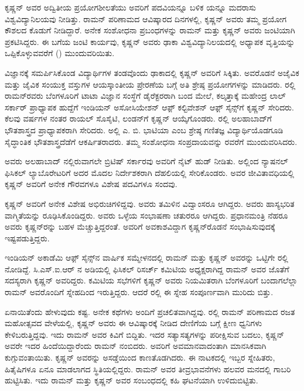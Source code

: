 ಕೃಷ್ಣನ್ ಅವರ ಅದ್ವಿತೀಯ ಪ್ರಯೋಗಶೀಲತೆಯು ಅವರಿಗೆ  ಪದವಿಯನ್ನೂ ಬಳಿಕ  ಯನ್ನೂ ಮದರಾಸು ವಿಶ್ವವಿದ್ಯಾನಿಲಯವು ನೀಡಿತ್ತು. ರಾಮನ್ ಪರಿಣಾಮದ ಆವಿಷ್ಕಾರದ ದಿನಗಳಲ್ಲಿ, ಕೃಷ್ಣನ್ ಅವರು ತಮ್ಮ ಪ್ರಯೋಗ ಕೌಶಲದ ಕೊಡುಗೆ ನೀಡಿದ್ದಾರೆ. ಅನೇಕ ಸಂಶೋಧನಾ ಪ್ರಬಂಧಗಳನ್ನು ರಾಮನ್ ಮತ್ತು ಕೃಷ್ಣನ್ ಅವರು ಜಂಟಿಯಾಗಿ ಪ್ರಕಟಿಸಿದ್ದರು. ಈ ಬಗೆಯ ಜಂಟಿ ಕಾರ್ಯವು, ಕೃಷ್ಣನ್ ಅವರು ಢಾಕಾ ವಿಶ್ವವಿದ್ಯಾನಿಲಯದಲ್ಲಿ ಅಧ್ಯಾಪಕ ವೃತ್ತಿಯನ್ನು ಒಪ್ಪಿಕೊಳ್ಳುವವರೆಗೆ () ಮುಂದುವರಿಯಿತು.

ವಿಜ್ಞಾನಕ್ಕೆ ಸಮರ್ಪಿಸಿಕೊಂಡ ವಿದ್ಯಾರ್ಥಿಗಳ ತಂಡವೊಂದು ಢಾಕಾದಲ್ಲಿ ಕೃಷ್ಣನ್ ಅವರಿಗೆ ಸಿಕ್ಕಿತು. ಅವರೊಡನೆ ಅಜೈವಿಕ ಮತ್ತು ಜೈವಿಕ ಸಂಯುಕ್ತ ವಸ್ತುಗಳ ಆಯಸ್ಕಾಂತೀಯ ಪ್ರೇರಣೆಯ ಬಗ್ಗೆ ಅತಿ ಶ್ರೇಷ್ಠ ಪ್ರಯೋಗಗಳನ್ನು ಮಾಡಿದರು. ರಲ್ಲಿ ರಾಮನ್‍ರವರು ಬೆಂಗಳೂರಿಗೆ ಟಾಟಾ ವಿಜ್ಞಾನ ಸಂಸ್ಥೆಗೆ ಡೈರೆಕ್ಟರರಾಗಿ ಬಂದ ಮೇಲೆ, ಕಲ್ಕತ್ತಾಕ್ಕೆ ಮಹೇಂದ್ರ ಲಾಲ್ ಸರ್ಕಾರ್ ಪ್ರಾಧ್ಯಾಪಕ ಹುದ್ದೆಗೆ ಇಂಡಿಯನ್ ಅಸೋಸಿಯೇಶನ್ ಆಫ಼್ ಕಲ್ಟಿವೇಶನ್ ಆಫ಼್ ಸೈನ್ಸ್‌ಗೆ ಕೃಷ್ಣನ್ ಸೇರಿದರು. ಕೆಲವು ವರ್ಷಗಳ ನಂತರ ರಾಯಲ್ ಸೊಸೈಟಿ, ಲಂಡನ್‍ಗೆ ಕೃಷ್ಣನ್ ಆಯ್ಕೆಗೊಂಡರು. ರಲ್ಲಿ ಅಲಹಾಬಾದ್‍ಗೆ ಭೌತಶಾಸ್ತ್ರದ ಪ್ರಾಧ್ಯಾಪಕರಾಗಿ ಸೇರಿದರು. ಅಲ್ಲಿ ಎ. ಬಿ. ಭಾಟಿಯಾ ಎಂಬ ಶ್ರೇಷ್ಠ ಗಣಿತಜ್ಞ ವಿದ್ಯಾರ್ಥಿಯೊಡಗೂಡಿ ಸೈದ್ಧಾಂತಿಕ ಭೌತಶಾಸ್ತ್ರದೆಡೆಗೆ ಆಕರ್ಷಿತರಾದರು. ತಮ್ಮ ಸಂಶೋಧನಾ ಸಂಪ್ರದಾಯವನ್ನು ರವರೆಗೆ ಮುಂದುವರಿಸಿದರು.

ಅವರು ಅಲಹಾಬಾದ್ ನಲ್ಲಿರುವಾಗಲೇ ಬ್ರಿಟಿಷ್ ಸರ್ಕಾರವು ಅವರಿಗೆ ನೈಟ್ ಹುಡ್ ನೀಡಿತು. ಅಲ್ಲಿಂದ ನ್ಯಾಷನಲ್ ಫಿಸಿಕಲ್ ಲ್ಯಾಬೊರೇಟರಿಗೆ ಅದರ ಮೊದಲ ನಿರ್ದೇಶಕರಾಗಿ ದೆಹಲಿಯಲ್ಲಿ ಸೇರಿಕೊಂಡರು. ಅವರ ಜೀವಿತಾವಧಿಯಲ್ಲಿ ಕೃಷ್ಣನ್ ಅವರಿಗೆ ಅನೇಕ ಗೌರವಗಳೂ ವಿಶೇಷ ಪದವಿಗಳೂ ಸಂದವು.

ಕೃಷ್ಣನ್ ಅವರಿಗೆ ಅನೇಕ ವಿಶೇಷ ಅಭಿರುಚಿಗಳಿದ್ದವು. ಅವರು ತಮಿಳಿನ ವಿದ್ವಾಂಸರೂ ಆಗಿದ್ದರು. ಅವರು ಹಾಸ್ಯಭರಿತ ವಾಗ್ಮಿತೆಯನ್ನು ರೂಢಿಸಿಕೊಂಡಿದ್ದರು. ಅವರು ಒಳ್ಳೆಯ ಸಂಭಾಷಣಾ ಚತುರರೂ ಆಗಿದ್ದರು. ಪ್ರಧಾನಮಂತ್ರಿ ನೆಹರೂ ಅವರು ಕೃಷ್ಣನ್‍ರನ್ನು ಬಹಳ ಮೆಚ್ಚುತ್ತಿದ್ದರಂತೆ. ಅವರಿಗೆ ಅವಕಾಶವಿದ್ದಾಗ ಕೃಷ್ಣನ್‍ರೊಡನೆ ಸಂಭಾಷಿಸುವುದಕ್ಕೆ ಇಷ್ಟಪಡುತ್ತಿದ್ದರು.

ಇಂಡಿಯನ್ ಅಕಾಡೆಮಿ ಆಫ಼್ ಸೈನ್ಸ್‌ನ ವಾರ್ಷಿಕ ಸಮ್ಮೇಳನದಲ್ಲಿ ರಾಮನ್ ಮತ್ತು ಕೃಷ್ಣನ್ ಅವರನ್ನು ಒಟ್ಟಿಗೇ ರಲ್ಲಿ ನೋಡಿದ್ದೆ. ಸಿ.ಎಸ್.ಐ.ಆರ್ ನ ಅಡಿಯಲ್ಲಿ ಫಿಸಿಕಲ್ ರಿಸರ್ಚ್ ಕಮಿಟಿಯ ಅಧ್ಯಕ್ಷರಾಗಿದ್ದ ರಾಮನ್ ಅವರ ಜೊತೆಗೆ ಸದಸ್ಯರಾಗಿ ಕೃಷ್ಣನ್ ಅವರಿದ್ದರು. ಕಮಿಟಿಯ ಸಭೆಗಳಿಗೆ ಕೃಷ್ಣನ್ ಅವರು ನಿಯಮಿತರಾಗಿ ಬೆಂಗಳೂರಿಗೆ ಬಂದಾಗಲೆಲ್ಲಾ ರಾಮನ್ ಅವರೊಂದಿಗೆ ಸ್ನೇಹದಿಂದ ಇರುತ್ತಿದ್ದರು. ಆದರೆ ರಲ್ಲಿ ಈ ಸ್ನೇಹ ಸಂಪೂರ್ಣವಾಗಿ ಮುರಿದು ಬಿತ್ತು.

ಏನಾಯಿತೆಂದು ಹೇಳುವುದು ಕಷ್ಟ. ಅನೇಕ ಕಥೆಗಳು ಅಂದಿಗೆ ಪ್ರಚಲಿತವಾಗಿದ್ದವು. ರಲ್ಲಿ ರಾಮನ್ ಪರಿಣಾಮದ ರಜತ ಮಹೋತ್ಸವದ ವೇಳೆಯಲ್ಲಿ, ಕೃಷ್ಣನ್ ಅವರು ಈ ಆವಿಷ್ಕಾರಕ್ಕೆ ನೀಡಿದ ದೇಣಿಗೆಯ ಬಗ್ಗೆ ಕ್ಷೀಣ ಧ್ವನಿಗಳು ಕೇಳಿಬರುತ್ತಿದ್ದವು. ಇದು ರಾಮನ್ ಅವರ ಕಿವಿಗೆ ಬಿದ್ದಿತು. ಇದರ ಸತ್ಯಾಸತ್ಯಗಳನ್ನು ಪರೀಕ್ಷಿಸುವ ಬದಲು, ಕೃಷ್ಣನ್ ಅವರೇ ಇದರ ಹಿಂದೆಯಿದ್ದಾರೆಂದು ರಾಮನ್ ನಂಬಿದರು. ಅವರಿಗೆ ಅವಮಾನವಾದಂತಾಗಿ ಮಾನಸಿಕವಾಗಿ ಕುಗ್ಗುವಂತಾಯಿತು. ಕೃಷ್ಣನ್ ಅವರನ್ನು ಅಸಡ್ಡೆಯಿಂದ ಕಾಣತೊಡಗಿದರು. ಈ ನಾಟಕದಲ್ಲಿ ಇಬ್ಬರ ಸ್ನೇಹಿತರು, ಹಿತೈಷಿಗಳೂ ಏನೂ ಮಾಡಲಾಗದ ಸ್ಥಿತಿಯಲ್ಲಿದ್ದರು. ರಾಮನ್ ಅವರ ತೀವ್ರಭಾವನೆಗಳು ಹಲವರ ಮನದಲ್ಲಿ ಗಾಬರಿ ಹುಟ್ಟಿಸಿತು. ಇದು ರಾಮನ್ ಮತ್ತು ಕೃಷ್ಣನ್ ಅವರ ಸಂಬಂಧದಲ್ಲಿ ಕಹಿ ಘಟನೆಯಾಗಿ ಉಳಿದುಬಿಟ್ಟಿತು.

